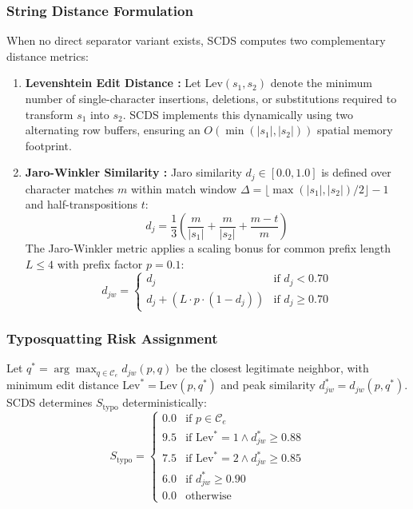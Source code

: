 \subsubsection{String Distance Formulation}
When no direct separator variant exists, SCDS computes two complementary distance metrics:
\begin{enumerate}
    \item \textbf{Levenshtein Edit Distance \cite{levenshtein1966binary}:} Let $\text{Lev}(s_1, s_2)$ denote the minimum number of single-character insertions, deletions, or substitutions required to transform $s_1$ into $s_2$. SCDS implements this dynamically using two alternating row buffers, ensuring an $O(\min(|s_1|, |s_2|))$ spatial memory footprint.
    \item \textbf{Jaro-Winkler Similarity \cite{winkler1990string}:} Jaro similarity $d_j \in [0.0, 1.0]$ is defined over character matches $m$ within match window $\Delta = \lfloor \max(|s_1|, |s_2|) / 2 \rfloor - 1$ and half-transpositions $t$:
    \begin{equation}
    d_j = \frac{1}{3}\left(\frac{m}{|s_1|} + \frac{m}{|s_2|} + \frac{m - t}{m}\right)
    \end{equation}
    The Jaro-Winkler metric applies a scaling bonus for common prefix length $L \le 4$ with prefix factor $p = 0.1$:
    \begin{equation}
    d_{jw} = \begin{cases} d_j & \text{if } d_j < 0.70 \\ d_j + (L \cdot p \cdot (1 - d_j)) & \text{if } d_j \ge 0.70 \end{cases}
    \end{equation}
\end{enumerate}

\subsubsection{Typosquatting Risk Assignment}
Let $q^* = \arg\max_{q \in \mathcal{C}_e} d_{jw}(p, q)$ be the closest legitimate neighbor, with minimum edit distance $\text{Lev}^* = \text{Lev}(p, q^*)$ and peak similarity $d_{jw}^* = d_{jw}(p, q^*)$. SCDS determines $S_{\text{typo}}$ deterministically:
\begin{equation}
S_{\text{typo}} = \begin{cases}
0.0 & \text{if } p \in \mathcal{C}_e \\
9.5 & \text{if } \text{Lev}^* = 1 \land d_{jw}^* \ge 0.88 \\
7.5 & \text{if } \text{Lev}^* = 2 \land d_{jw}^* \ge 0.85 \\
6.0 & \text{if } d_{jw}^* \ge 0.90 \\
0.0 & \text{otherwise}
\end{cases}
\end{equation}

